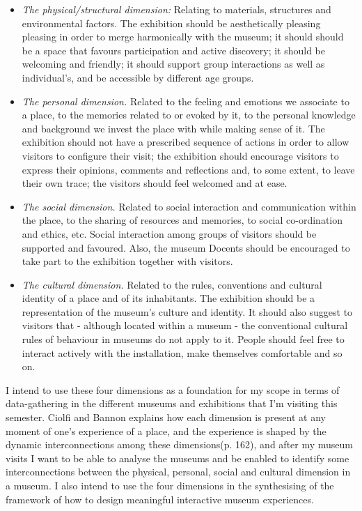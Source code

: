 \begin{itemize}
  \item \emph{The physical/structural dimension:} Relating to materials, structures and environmental factors. The exhibition should be aesthetically pleasing pleasing in order to merge harmonically with the museum; it should should be a space that favours participation and active discovery; it should be welcoming and friendly; it should support group interactions as well as individual's, and be accessible by different age groups.
  \item \emph{The personal dimension.} Related to the feeling and emotions we associate to a place, to the memories related to or evoked by it, to the personal knowledge and background we invest the place with while making sense of it. The exhibition should not have a prescribed sequence of actions in order to allow visitors to configure their visit; the exhibition should encourage visitors to express their opinions, comments and reflections and, to some extent, to leave their own trace; the visitors should feel welcomed and at ease. 
  \item \emph{The social dimension.} Related to social interaction and communication within the place, to the sharing of resources and memories, to social co-ordination and ethics, etc. Social interaction among groups of visitors should be supported and favoured. Also, the museum Docents should be encouraged to take part to the exhibition together with visitors.
  \item \emph{The cultural dimension.} Related to the rules, conventions and cultural identity of a place and of its inhabitants. The exhibition should be a representation of the museum's culture and identity. It should also suggest to visitors that - although located within a museum - the conventional cultural rules of behaviour in museums do not apply to it. People should feel free to interact actively with the installation, make themselves comfortable and so on.
\end{itemize}

I intend to use these four dimensions as a foundation for my scope in terms of data-gathering in the different museums and exhibitions that I’m visiting this semester. Ciolfi and Bannon explains how each dimension is present at any moment of one’s experience of a place, and the experience is shaped by the dynamic interconnections among these dimensions(p. 162), and after my museum visits I want to be able to analyse the museums and be enabled to identify some interconnections between the physical, personal, social and cultural dimension in a museum. I also intend to use the four dimensions in the synthesising of the framework of how to design meaningful interactive museum experiences.

